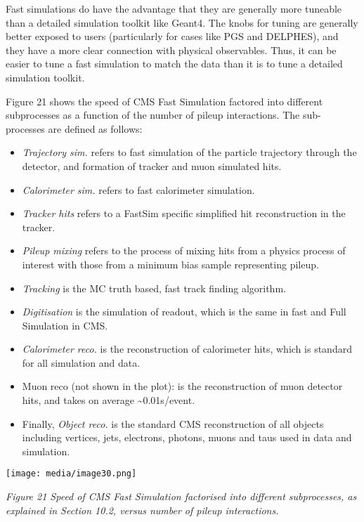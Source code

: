 \documentclass[12pt,a4paper]{article}
\begin{document}
Fast simulations do have the advantage that they are generally more
tuneable than a detailed simulation toolkit like Geant4. The knobs for
tuning are generally better exposed to users (particularly for cases
like PGS and DELPHES), and they have a more clear connection with
physical observables. Thus, it can be easier to tune a fast simulation
to match the data than it is to tune a detailed simulation toolkit.

Figure 21 shows the speed of CMS Fast Simulation factored into different
subprocesses as a function of the number of pileup interactions. The
sub-processes are defined as follows:

\begin{itemize}
\item
  \emph{Trajectory sim.} refers to fast simulation of the particle
  trajectory through the detector, and formation of tracker and muon
  simulated hits.
\item
  \emph{Calorimeter sim.} refers to fast calorimeter simulation.
\item
  \emph{Tracker hits} refers to a FastSim specific simplified hit
  reconstruction in the tracker.
\item
  \emph{Pileup mixing} refers to the process of mixing hits from a
  physics process of interest with those from a minimum bias sample
  representing pileup.
\item
  \emph{Tracking} is the MC truth based, fast track finding algorithm.
\item
  \emph{Digitisation} is the simulation of readout, which is the same in
  fast and Full Simulation in CMS.
\item
  \emph{Calorimeter reco.} is the reconstruction of calorimeter hits,
  which is standard for all simulation and data.
\item
  Muon reco (not shown in the plot): is the reconstruction of muon
  detector hits, and takes on average \textasciitilde{}0.01s/event.
\item
  Finally, \emph{Object reco.} is the standard CMS reconstruction of all
  objects including vertices, jets, electrons, photons, muons and taus
  used in data and simulation.
\end{itemize}

\texttt{[image: media/image30.png]}

\emph{Figure 21 Speed of CMS Fast Simulation factorised into different
subprocesses, as explained in Section 10.2, versus number of pileup
interactions. }
\end{document}
